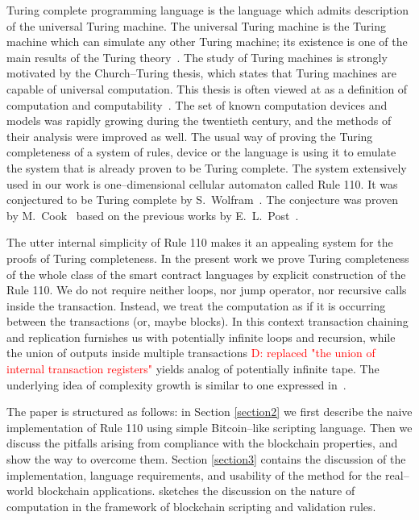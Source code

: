 \documentclass[runningheads]{llncs}
\newcommand{\dnote}[1]{\textcolor{red}{D: {#1}}}
\begin{document}
    Turing complete programming language is the language which admits
    description of the universal Turing machine. The universal Turing machine is
    the Turing machine which can simulate any other Turing machine; its
    existence is one of the main results of the Turing
    theory~\cite{turing1937computable}. The study of Turing machines is strongly
    motivated by the Church--Turing thesis, which states that Turing machines
    are capable of universal computation. This thesis is often viewed at as a
    definition of computation and computability~\cite{turing1939systems}. The
    set of known computation devices and models was rapidly growing during the
    twentieth century, and the methods of their analysis were improved as well.
    The usual way of proving the Turing completeness of a system of rules,
    device or the language is using it to emulate the system that is already
    proven to be Turing complete.  The system extensively used in our work is
    one--dimensional cellular automaton called Rule 110. It was conjectured to
    be Turing complete by S.~Wolfram~\cite{wolfram1986theory}. The conjecture
    was proven by M.~Cook~\cite{cook2004universality} based on the previous
    works by E.~L.~Post~\cite{post1943formal}.

    The utter internal simplicity of Rule 110 makes it an appealing system for
    the proofs of Turing completeness. In the present work we prove Turing
    completeness of the whole class of the smart contract languages by explicit
    construction of the Rule 110. We do not require neither loops, nor jump
    operator, nor recursive calls inside the transaction. Instead, we treat the
    computation as if it is occurring between the transactions (or, maybe
    blocks). In this context transaction chaining and replication furnishes us
    with potentially infinite loops and recursion, while the union of outputs
    inside multiple transactions \dnote{replaced "the union of internal transaction registers"}
    yields analog of potentially infinite tape. The
    underlying idea of complexity growth is similar to one expressed
    in~\cite{von1951general}.

    The paper is structured as follows: in Section \ref{section2} we first
    describe the naive implementation of Rule 110 using simple Bitcoin--like
    scripting language.  Then we discuss the pitfalls arising from compliance
    with the blockchain properties, and show the way to overcome them.
    Section \ref{section3} contains the discussion of
    the implementation, language requirements, and usability of the method for
    the real--world blockchain applications.  sketches the discussion on the
    nature of computation in the framework of blockchain scripting and
    validation rules.
\end{document}
